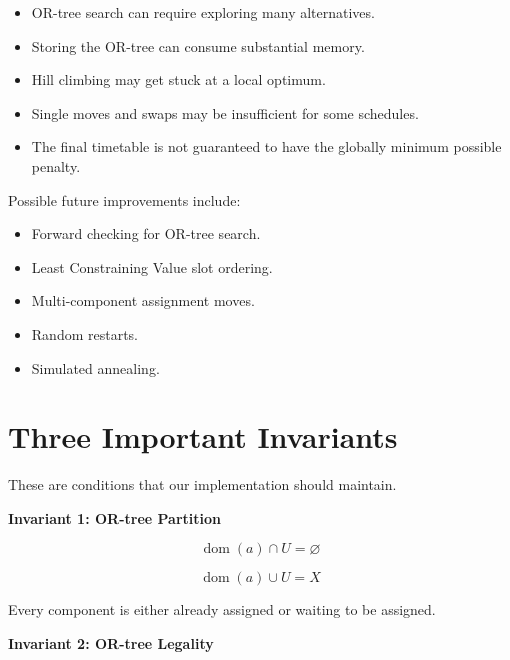 \documentclass[11pt,letterpaper]{article}
\newcommand{\dom}{\operatorname{dom}}
\begin{document}
\begin{itemize}
    \item OR-tree search can require
    exploring many alternatives.

    \item Storing the OR-tree can consume
    substantial memory.

    \item Hill climbing may get stuck
    at a local optimum.

    \item Single moves and swaps may
    be insufficient for some schedules.

    \item The final timetable is not
    guaranteed to have the globally
    minimum possible penalty.
\end{itemize}

Possible future improvements include:

\begin{itemize}
    \item Forward checking for OR-tree search.
    \item Least Constraining Value slot ordering.
    \item Multi-component assignment moves.
    \item Random restarts.
    \item Simulated annealing.
\end{itemize}

\section{Three Important Invariants}

These are conditions that our implementation
should maintain.

\textbf{Invariant 1: OR-tree Partition}

\begin{equation}
\boxed{
\dom(a)\cap U=\varnothing
}
\end{equation}

\begin{equation}
\boxed{
\dom(a)\cup U=X
}
\end{equation}

Every component is either already assigned
or waiting to be assigned.

\textbf{Invariant 2: OR-tree Legality}
\end{document}

